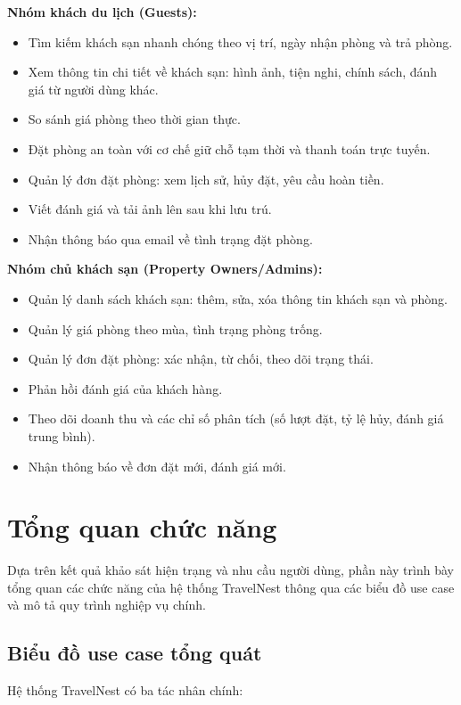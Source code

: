 \documentclass[13pt,a4paper,twoside]{report}
\begin{document}
\textbf{Nhóm khách du lịch (Guests):}
\begin{itemize}
  \item Tìm kiếm khách sạn nhanh chóng theo vị trí, ngày nhận phòng và trả phòng.
  \item Xem thông tin chi tiết về khách sạn: hình ảnh, tiện nghi, chính sách, đánh giá từ người dùng khác.
  \item So sánh giá phòng theo thời gian thực.
  \item Đặt phòng an toàn với cơ chế giữ chỗ tạm thời và thanh toán trực tuyến.
  \item Quản lý đơn đặt phòng: xem lịch sử, hủy đặt, yêu cầu hoàn tiền.
  \item Viết đánh giá và tải ảnh lên sau khi lưu trú.
  \item Nhận thông báo qua email về tình trạng đặt phòng.
\end{itemize}

\textbf{Nhóm chủ khách sạn (Property Owners/Admins):}
\begin{itemize}
  \item Quản lý danh sách khách sạn: thêm, sửa, xóa thông tin khách sạn và phòng.
  \item Quản lý giá phòng theo mùa, tình trạng phòng trống.
  \item Quản lý đơn đặt phòng: xác nhận, từ chối, theo dõi trạng thái.
  \item Phản hồi đánh giá của khách hàng.
  \item Theo dõi doanh thu và các chỉ số phân tích (số lượt đặt, tỷ lệ hủy, đánh giá trung bình).
  \item Nhận thông báo về đơn đặt mới, đánh giá mới.
\end{itemize}

\section{Tổng quan chức năng}

Dựa trên kết quả khảo sát hiện trạng và nhu cầu người dùng, phần này trình bày tổng quan các chức năng của hệ thống TravelNest thông qua các biểu đồ use case và mô tả quy trình nghiệp vụ chính.

\subsection{Biểu đồ use case tổng quát}

Hệ thống TravelNest có ba tác nhân chính:
\end{document}
